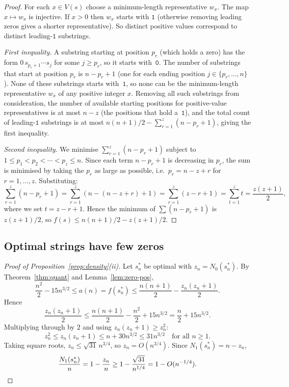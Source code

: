 ﻿\documentclass[11pt,a4paper]{article}
\theoremstyle{plain}
\theoremstyle{definition}
\theoremstyle{remark}
\newcommand{\ones}{N_1}
\newcommand{\zeros}{N_0}
\begin{document}
\begin{proof}
For each $x\in V(s)$ choose a minimum-length representative $w_x$.
The map $x\mapsto w_x$ is injective.  If $x>0$ then $w_x$ starts with
$\mathtt{1}$ (otherwise removing leading zeros gives a shorter
representative).  So distinct positive values correspond to distinct
leading-$\mathtt{1}$ substrings.

\textit{First inequality.}
A substring starting at position $p_r$ (which holds a zero) has the
form $0\,s_{p_r+1}\cdots s_j$ for some $j\ge p_r$, so it starts
with~$\mathtt{0}$.  The number of substrings that start at position
$p_r$ is $n-p_r+1$ (one for each ending position $j\in\{p_r,\ldots,n\}$).
None of these substrings starts with~$\mathtt{1}$, so none can be the
minimum-length representative $w_x$ of any positive integer $x$.
Removing all such substrings from consideration, the number of
available starting positions for positive-value representatives is at
most $n-z$ (the positions that hold a~$\mathtt{1}$), and the total
count of leading-$\mathtt{1}$ substrings is at most
$n(n+1)/2-\sum_{r=1}^{z}(n-p_r+1)$, giving the first inequality.

\textit{Second inequality.}
We minimise $\sum_{r=1}^{z}(n-p_r+1)$ subject to
$1\le p_1<p_2<\cdots<p_z\le n$.  Since each term $n-p_r+1$
is decreasing in $p_r$, the sum is minimised by taking the $p_r$ as
large as possible, i.e.\ $p_r=n-z+r$ for $r=1,\ldots,z$.
Substituting:
\[
  \sum_{r=1}^{z}(n-p_r+1)
  = \sum_{r=1}^{z}(n-(n-z+r)+1)
  = \sum_{r=1}^{z}(z-r+1)
  = \sum_{t=1}^{z}t
  = \frac{z(z+1)}{2},
\]
where we set $t=z-r+1$.  Hence the minimum of $\sum(n-p_r+1)$ is
$z(z+1)/2$, so $f(s)\le n(n+1)/2-z(z+1)/2$.
\end{proof}

\subsection{Optimal strings have few zeros}

\begin{proof}[Proof of Proposition~\ref{prop:density}(ii)]
Let $s_n^*$ be optimal with $z_n=\zeros(s_n^*)$.  By
Theorem~\ref{thm:quant} and Lemma~\ref{lem:zero-pos},
\[
  \frac{n^2}{2}-15n^{3/2}
  \le a(n)=f(s_n^*)
  \le\frac{n(n+1)}{2}-\frac{z_n(z_n+1)}{2}.
\]
Hence
\[
  \frac{z_n(z_n+1)}{2}
  \le\frac{n(n+1)}{2}-\frac{n^2}{2}+15n^{3/2}
  =\frac{n}{2}+15n^{3/2}.
\]
Multiplying through by $2$ and using $z_n(z_n+1)\ge z_n^2$:
\[
  z_n^2 \le z_n(z_n+1) \le n+30n^{3/2} \le 31n^{3/2}
  \quad\text{for all }n\ge1.
\]
Taking square roots, $z_n \le \sqrt{31}\,n^{3/4}$, so
$z_n=O(n^{3/4})$.  Since $\ones(s_n^*)=n-z_n$,
\[
  \frac{\ones(s_n^*)}{n} = 1-\frac{z_n}{n} \ge 1-\frac{\sqrt{31}}{n^{1/4}}
  = 1-O(n^{-1/4}).\qedhere
\]
\end{proof}
\end{document}
